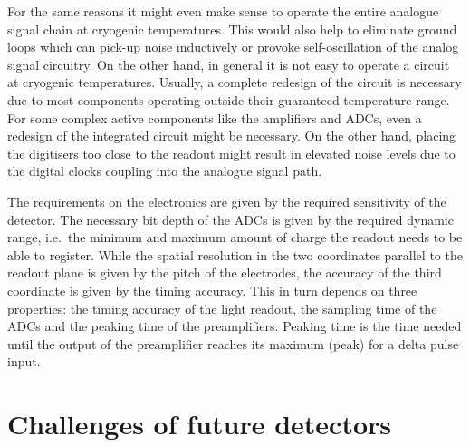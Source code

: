 For the same reasons it might even make sense to operate the entire analogue signal chain at cryogenic temperatures.
This would also help to eliminate ground loops which can pick-up noise inductively or provoke self-oscillation of the analog signal circuitry.
On the other hand, in general it is not easy to operate a circuit at cryogenic temperatures.
Usually, a complete redesign of the circuit is necessary due to most components operating outside their guaranteed temperature range.
For some complex active components like the amplifiers and ADCs, even a redesign of the integrated circuit might be necessary.
On the other hand, placing the digitisers too close to the readout might result in elevated noise levels due to the digital clocks coupling into the analogue signal path.

The requirements on the electronics are given by the required sensitivity of the detector.
The necessary bit depth of the ADCs is given by the required dynamic range, i.e.\ the minimum and maximum amount of charge the readout needs to be able to register.
While the spatial resolution in the two coordinates parallel to the readout plane is given by the pitch of the electrodes, the accuracy of the third coordinate is given by the timing accuracy.
This in turn depends on three properties: the timing accuracy of the light readout, the sampling time of the ADCs and the peaking time of the preamplifiers.
Peaking time is the time needed until the output of the preamplifier reaches its maximum (peak) for a delta pulse input.


\section{Challenges of future detectors\label{sec:lartpc_challenges}}